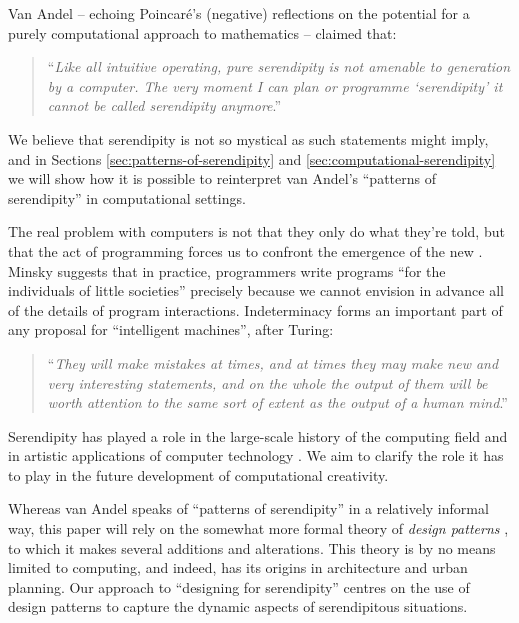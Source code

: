 \documentclass{llncs}
\begin{document}
Van Andel \cite{van1994anatomy} -- echoing Poincar\'e's
\cite{poincare1910creation} (negative) reflections on the potential
for a purely computational approach to mathematics -- claimed that:
\begin{quote}
``\emph{Like all intuitive operating, pure serendipity is not amenable
    to generation by a computer.  The very moment I can plan or
    programme `serendipity' it cannot be called serendipity
    anymore}.'' \cite{van1994anatomy}
\end{quote}
We believe that serendipity is not so mystical as such statements
might imply, and in Sections \ref{sec:patterns-of-serendipity} and
\ref{sec:computational-serendipity} we will show how it is possible to
reinterpret van Andel's ``patterns of serendipity'' in computational
settings.  

The real problem with computers is not that they only do what they're
told, but that the act of programming forces us to confront the
emergence of the new \cite{mead1932philosophy}.
%
Minsky \cite{minsky1967programming} suggests that in practice,
programmers write programs ``for the individuals of little societies''
precisely because we cannot envision in advance all of the details of
program interactions.
%
Indeterminacy forms an important part of any proposal for
``intelligent machines'', after Turing:
\begin{quote}
``\emph{They will make mistakes at times, and at times they may make
    new and very interesting statements, and on the whole the output
    of them will be worth attention to the same sort of extent as the
    output of a human mind}.''  \cite{turing-intelligent}
\end{quote}

Serendipity has played a role in the large-scale history of the
computing field \cite{de2013turing} and in artistic applications of
computer technology \cite{reichardt1969cybernetic}.  We aim to clarify
the role it has to play in the future development of computational
creativity.

Whereas van Andel speaks of ``patterns of serendipity'' in a
relatively informal way, this paper will rely on the somewhat more
formal theory of \emph{design patterns} \cite{alexander1999origins},
to which it makes several additions and alterations.  This theory is
by no means limited to computing, and indeed, has its origins in
architecture and urban planning.  Our approach to ``designing for
serendipity'' \cite{andre2009discovery} centres on the use of design
patterns to capture the dynamic aspects of serendipitous situations.
\end{document}
